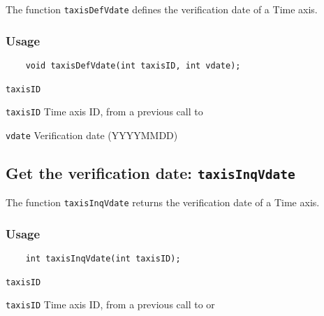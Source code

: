 The function {\texttt{taxisDefVdate}} defines the verification date of a Time axis.

\subsubsection*{Usage}

\begin{verbatim}
    void taxisDefVdate(int taxisID, int vdate);
\end{verbatim}

\hspace*{4mm}\begin{minipage}[]{15cm}
\begin{deflist}{\texttt{taxisID}\ }
\item[\texttt{taxisID}]
Time axis ID, from a previous call to {}
\item[\texttt{vdate}]
Verification date (YYYYMMDD)

\end{deflist}
\end{minipage}


\subsection{Get the verification date: \texttt{taxisInqVdate}}
\label{taxisInqVdate}

The function {\texttt{taxisInqVdate}} returns the verification date of a Time axis.

\subsubsection*{Usage}

\begin{verbatim}
    int taxisInqVdate(int taxisID);
\end{verbatim}

\hspace*{4mm}\begin{minipage}[]{15cm}
\begin{deflist}{\texttt{taxisID}\ }
\item[\texttt{taxisID}]
Time axis ID, from a previous call to {} or {}

\end{deflist}
\end{minipage}

